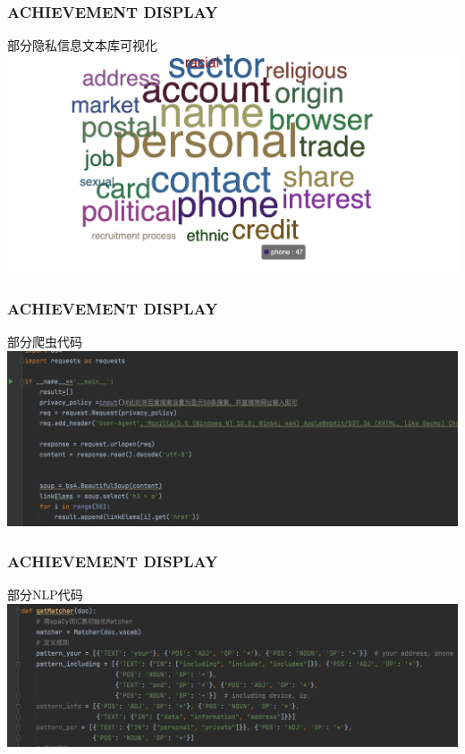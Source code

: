 \documentclass[10pt]{ctexbeamer}
\begin{document}
    \begin{frame}
        \frametitle{ACHIEVEMENT DISPLAY}
    
        \begin{block}{部分隐私信息文本库可视化}
            \includegraphics[scale=0.305]{dictionary.png}
        \end{block}
    \end{frame}

    \begin{frame}
        \frametitle{ACHIEVEMENT DISPLAY}
    
        \begin{block}{部分爬虫代码}
            \includegraphics[scale=0.305]{crawler.png}
        \end{block}
    \end{frame}

    \begin{frame}
        \frametitle{ACHIEVEMENT DISPLAY}
    
        \begin{block}{部分NLP代码}
            \includegraphics[scale=0.305]{nlp.png}
        \end{block}
    \end{frame}
\end{document}
